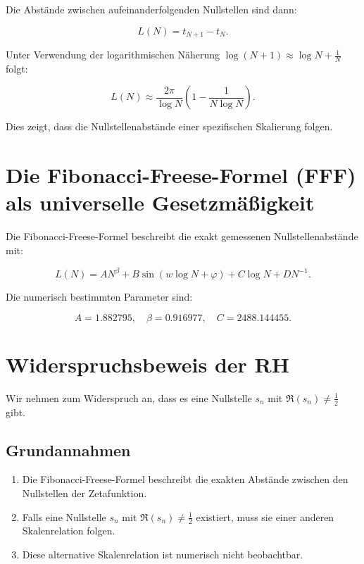 \documentclass[a4paper,12pt]{article}
\begin{document}
Die Abstände zwischen aufeinanderfolgenden Nullstellen sind dann:

\begin{equation}
L(N) = t_{N+1} - t_N.
\end{equation}

Unter Verwendung der logarithmischen Näherung \( \log (N+1) \approx \log N + \frac{1}{N} \) folgt:

\begin{equation}
L(N) \approx \frac{2\pi}{\log N} \left(1 - \frac{1}{N \log N} \right).
\end{equation}

Dies zeigt, dass die Nullstellenabstände einer spezifischen Skalierung folgen.

\section{Die Fibonacci-Freese-Formel (FFF) als universelle Gesetzmäßigkeit}

Die Fibonacci-Freese-Formel beschreibt die exakt gemessenen Nullstellenabstände mit:

\begin{equation}
L(N) = A N^\beta + B \sin(w \log N + \varphi) + C \log N + D N^{-1}.
\end{equation}

Die numerisch bestimmten Parameter sind:

\[
A = 1.882795, \quad \beta = 0.916977, \quad C = 2488.144455.
\]

\section{Widerspruchsbeweis der RH}

Wir nehmen zum Widerspruch an, dass es eine Nullstelle \( s_n \) mit \( \Re(s_n) \neq \frac{1}{2} \) gibt.

\subsection{Grundannahmen}
\begin{enumerate}
    \item Die Fibonacci-Freese-Formel beschreibt die exakten Abstände zwischen den Nullstellen der Zetafunktion.
    \item Falls eine Nullstelle \( s_n \) mit \( \Re(s_n) \neq \frac{1}{2} \) existiert, muss sie einer anderen Skalenrelation folgen.
    \item Diese alternative Skalenrelation ist numerisch nicht beobachtbar.
\end{enumerate}
\end{document}
